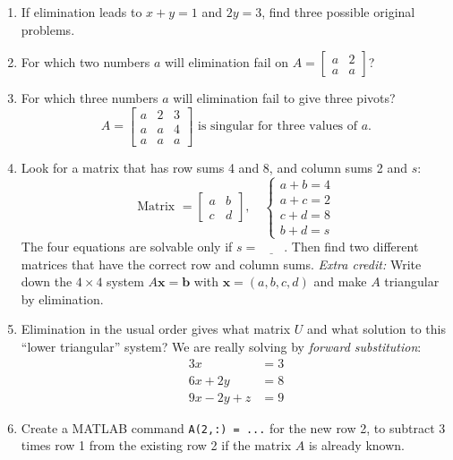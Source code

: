 \documentclass[14pt, a4paper]{article}
\begin{document}
\begin{enumerate}[resume]
    \item If elimination leads to $x + y = 1$ and $2y = 3$, find three possible original problems.

    \item For which two numbers $a$ will elimination fail on
          $A = \begin{bmatrix} a & 2 \\ a & a \end{bmatrix}$?

    \item For which three numbers $a$ will elimination fail to give three pivots?
          \[
              A = \begin{bmatrix}
                  a & 2 & 3 \\
                  a & a & 4 \\
                  a & a & a
              \end{bmatrix}
              \text{ is singular for three values of } a.
          \]

    \item Look for a matrix that has row sums 4 and 8, and column sums 2 and $s$:
          \[
              \text{Matrix } = \begin{bmatrix} a & b \\ c & d \end{bmatrix},
              \quad
              \begin{cases}
                  a + b = 4 \\
                  a + c = 2 \\
                  c + d = 8 \\
                  b + d = s
              \end{cases}
          \]
          The four equations are solvable only if $s = \underline{\hspace{2em}}$. Then find two different matrices that have the correct row and column sums.
          \textit{Extra credit:} Write down the $4 \times 4$ system $A\boldsymbol{x} = \boldsymbol{b}$ with $\boldsymbol{x} = (a,b,c,d)$ and make $A$ triangular by elimination.

    \item Elimination in the usual order gives what matrix $U$ and what solution to this ``lower triangular'' system? We are really solving by \textit{forward substitution}:
          \[
              \begin{aligned}
                  3x \phantom{{}+2y} \phantom{{}+z} & = 3 \\
                  6x + 2y \phantom{{}+z}            & = 8 \\
                  9x - 2y + z                       & = 9
              \end{aligned}
          \]

    \item Create a \textcolor{blue!60!white}{MATLAB} command \texttt{A(2,:) = ...} for the new row 2, to subtract 3 times row 1 from the existing row 2 if the matrix $A$ is already known.

\end{enumerate}
\end{document}
